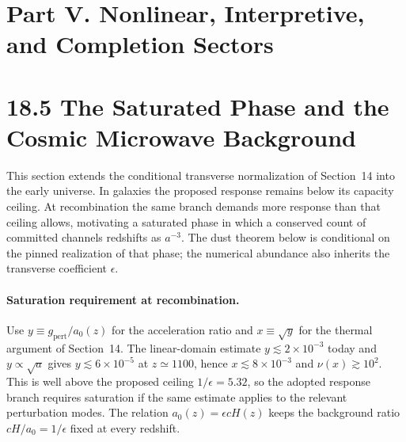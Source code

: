 \documentclass[11pt]{article}
\begin{document}
\section*{Part V. Nonlinear, Interpretive, and Completion Sectors}

\section{18.5 The Saturated Phase and the Cosmic Microwave Background}

This section extends the conditional transverse normalization of Section~14 into the early universe. In galaxies the proposed response remains below its capacity ceiling. At recombination the same branch demands more response than that ceiling allows, motivating a saturated phase in which a conserved count of committed channels redshifts as $a^{-3}$. The dust theorem below is conditional on the pinned realization of that phase; the numerical abundance also inherits the transverse coefficient $\epsilon$.

\paragraph{Saturation requirement at recombination.}
Use $y\equiv g_{\mathrm{pert}}/a_0(z)$ for the acceleration ratio and $x\equiv\sqrt y$ for the thermal argument of Section~14. The linear-domain estimate $y\lesssim2\times10^{-3}$ today and $y\propto\sqrt a$ gives $y\lesssim6\times10^{-5}$ at $z\simeq1100$, hence $x\lesssim8\times10^{-3}$ and $\nu(x)\gtrsim10^2$. This is well above the proposed ceiling $1/\epsilon=5.32$, so the adopted response branch requires saturation if the same estimate applies to the relevant perturbation modes. The relation $a_0(z)=\epsilon cH(z)$ keeps the background ratio $cH/a_0=1/\epsilon$ fixed at every redshift.
\end{document}
